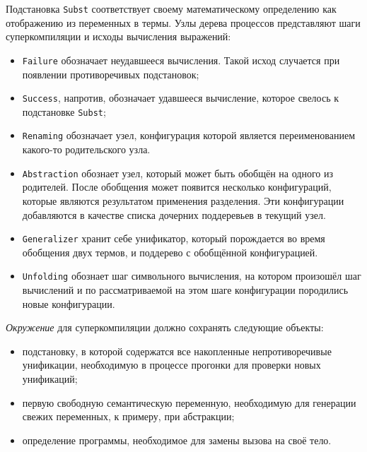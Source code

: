 Подстановка \lstinline{Subst} соответствует своему математическому определению как отображению из
переменных в термы.
Узлы дерева процессов представляют шаги суперкомпиляции и исходы вычисления выражений:
\begin{itemize}
\item \lstinline{Failure} обозначает неудавшееся вычисления. Такой исход
      случается при появлении противоречивых подстановок;
\item \lstinline{Success}, напротив, обозначает удавшееся вычисление, которое свелось к подстановке \lstinline{Subst};
\item \lstinline{Renaming} обозначает узел, конфигурация которой является переименованием какого-то родительского узла.
\item \lstinline{Abstraction} обознает узел, который может быть обобщён на одного из родителей.
      После обобщения может появится несколько конфигураций, которые являются результатом применения разделения.
      Эти конфигурации добавляются в качестве списка дочерних поддеревьев в текущий узел. 
\item \lstinline{Generalizer} хранит себе унификатор, который порождается во время обобщения
      двух термов, и поддерево с обобщённой конфигурацией.
\item \lstinline{Unfolding} обознает шаг символьного вычисления, на котором произошёл шаг вычислений
      и по рассматриваемой на этом шаге конфигурации породились новые конфигурации.
\end{itemize}


\emph{Окружение} для суперкомпиляции должно сохранять следующие объекты:
\begin{itemize}
\item подстановку, в которой содержатся все накопленные непротиворечивые унификации,
      необходимую в процессе прогонки для проверки новых унификаций;
\item первую свободную семантическую переменную, необходимую для генерации свежих переменных,
      к примеру, при абстракции;
\item определение программы, необходимое для замены вызова на своё тело.
\end{itemize}

